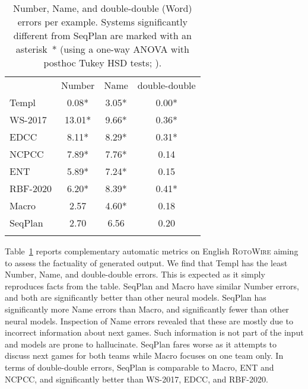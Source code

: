 \begin{table}
\centering
\footnotesize
\begin{tabular}{ l|c|c|c} 
 \thickhline
 & Number & Name & double-double\\
 \thickhline
 Templ & \hspace*{1ex}0.08*&3.05* & 0.00*\\ \hline \hline
WS-2017 & 13.01*& 9.66* & 0.36*\\
 EDCC & \hspace*{1ex}8.11*& 8.29* & 0.31*\\ 
 NCPCC&\hspace*{1ex}7.89* & 7.76* & \hspace*{-1ex}0.14\\
 ENT & \hspace*{1ex}5.89* &7.24* & \hspace*{-1ex}0.15\\
RBF-2020 &\hspace*{1ex}6.20* &8.39*& 0.41*\\
Macro & 2.57 &4.60*  & \hspace*{-1ex}0.18\\
SeqPlan & 2.70& \hspace*{-1ex}6.56 & \hspace*{-1ex}0.20\\
 \thickhline
\end{tabular}
\caption{Number, Name, and double-double (Word) errors per
  example. Systems significantly different from   SeqPlan are marked
  with an asterisk~* (using a one-way ANOVA with
  posthoc Tukey HSD tests; \mbox{}).}
\label{tab:fact-eval}
\end{table}



Table~\ref{tab:fact-eval} reports complementary automatic metrics on
English \textsc{RotoWire} aiming to assess the factuality of generated
output.  We find that Templ has the least Number, Name, and
double-double errors. This is expected as it simply reproduces facts
from the table.  SeqPlan and Macro have similar Number errors, and
both are significantly better than other neural models. SeqPlan has
significantly more Name errors than Macro, and significantly fewer
than other neural models.  Inspection of Name errors revealed that
these are mostly due to incorrect information about next games. Such
information is not part of the input and models are prone to
hallucinate.  SeqPlan fares worse as it attempts to discuss next games
for both teams while Macro focuses on one team only. In terms of
double-double errors, SeqPlan is comparable to Macro, ENT and
NCPCC, and significantly better than WS-2017, EDCC, and
RBF-2020.


